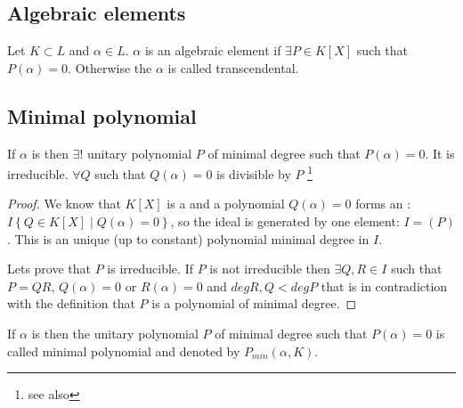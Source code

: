 \subsection{Algebraic elements}

\begin{definition}
  Let $K \subset L$ and $\alpha \in L$. $\alpha$ is an algebraic
  element if $\exists P \in K\left[X\right]$ such that
  $P\left(\alpha\right) = 0$. Otherwise the $\alpha$ is called
  transcendental.
  \label{def:algebraicelement}
\end{definition}

\subsection{Minimal polynomial}

\begin{lemma}
  If $\alpha$ is  then
  $\exists!$ unitary polynomial $P$ of minimal degree such that
  $P\left(\alpha\right) = 0$. It is irreducible. $\forall Q$ such that
  $Q\left(\alpha\right) = 0$ is divisible by $P$
  \footnote{
    see also 
  }
  \begin{proof}
    We know that $K\left[X\right]$ is a  and a
    polynomial $Q\left(\alpha\right) = 0$ forms an
    : $I \left\{Q \in K\left[X\right] \mid
    Q\left(\alpha\right) = 0 \right\}$, so the ideal is generated by
    one element: $I = \left(P\right)$. This is an unique (up to
    constant) polynomial minimal degree in $I$.
    
    Lets prove that $P$ is irreducible. If $P$ is not irreducible then
    $\exists Q,R \in I$ such that $P = Q 
    R$, $Q(\alpha) = 0$ or $R(\alpha) = 0$ and
    $deg R,Q < deg P$ that is in contradiction with the definition
    that $P$ is a polynomial of minimal degree.    
  \end{proof}
  \label{lem:minpolynomial}
\end{lemma}

\begin{definition}
  If $\alpha$ is  then
  the unitary polynomial $P$ of minimal degree such that
  $P\left(\alpha\right) = 0$ is called minimal polynomial and denoted
  by  $P_{min}\left(\alpha, K\right)$.
  \label{def:minpolynomial}
\end{definition}


